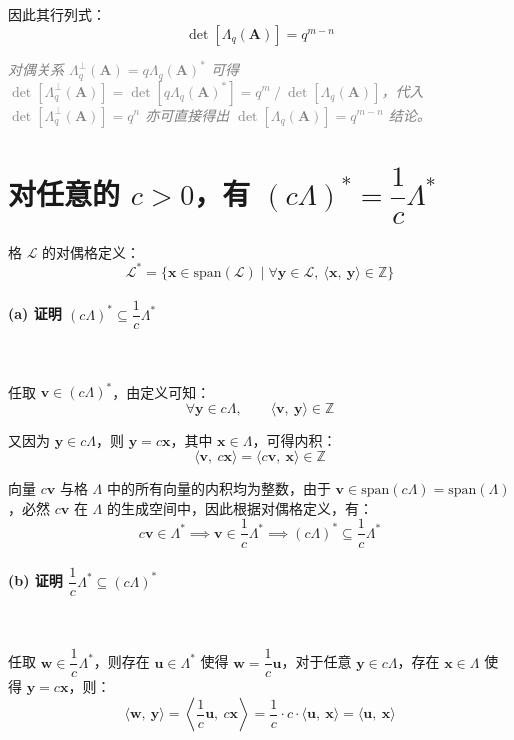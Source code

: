 \documentclass{article}
\begin{document}
因此其行列式：
\[ \det\left[\Lambda_{q}\left(\bm{A}\right)\right]=q^{m-n} \]

\textit{\textcolor{gray}{对偶关系 $\Lambda_{q}^{\perp}\left(\bm{A}\right)=q\Lambda_q(\bm{A})^{*}$ 可得 $\det\left[\Lambda_{q}^{\perp}\left(\bm{A}\right)\right]=\det\left[q\Lambda_q\left(\bm{A}\right)^{*}\right]=q^m\ /\ \det\left[\Lambda_q\left(\bm{A}\right)\right]$，代入 $\det\left[\Lambda_{q}^{\perp}\left(\bm{A}\right)\right]=q^n$ 亦可直接得出 $\det\left[\Lambda_{q}\left(\bm{A}\right)\right]=q^{m-n}$ 结论。}}



\section{对任意的 $c>0$，有 $(c\Lambda)^{*}=\dfrac{1}{c}\Lambda^{*}$}

格 $\mathcal{L}$ 的对偶格定义：
\[ \mathcal{L}^{*}=\{\bm{x}\in\mathrm{span}\left(\mathcal{L}\right)\mid\forall\bm{y}\in\mathcal{L},\ \langle\bm{x},\ \bm{y}\rangle\in\mathbb{Z} \} \]



\paragraph*{(a) 证明 $(c\Lambda)^{*}\subseteq\dfrac{1}{c}\Lambda^{*}$}~{\\[-7pt]}

任取 $\bm{v}\in(c\Lambda)^{*}$，由定义可知：
\[ \forall\bm{y}\in c\Lambda,\qquad\langle\bm{v},\ \bm{y}\rangle\in\mathbb{Z} \]

又因为 $\bm{y}\in c\Lambda$，则 $\bm{y}=c\bm{x}$，其中 $\bm{x}\in\Lambda$，可得内积：
\[ \langle\bm{v},\ c\bm{x}\rangle=\langle c\bm{v},\ \bm{x}\rangle\in\mathbb{Z} \]

向量 $c\bm{v}$ 与格 $\Lambda$ 中的所有向量的内积均为整数，由于 $\bm{v}\in\mathrm{span}\left(c\Lambda\right)=\mathrm{span}\left(\Lambda\right)$，必然 $c\bm{v}$ 在 $\Lambda$ 的生成空间中，因此根据对偶格定义，有：
\[ c\bm{v}\in\Lambda^{*}\implies\bm{v}\in\dfrac{1}{c}\Lambda^{*}\implies(c\Lambda)^{*}\subseteq\dfrac{1}{c}\Lambda^{*} \]



\paragraph*{(b) 证明 $\dfrac{1}{c}\Lambda^{*}\subseteq(c\Lambda)^{*}$}~{\\[-7pt]}

任取 $\bm{w}\in\dfrac{1}{c}\Lambda^{*}$，则存在 $\bm{u}\in\Lambda^{*}$ 使得 $\bm{w}=\dfrac{1}{c}\bm{u}$，对于任意 $\bm{y}\in c\Lambda$，存在 $\bm{x}\in\Lambda$ 使得 $\bm{y}=c\bm{x}$，则：
\[ \langle\bm{w},\ \bm{y}\rangle=\left\langle\dfrac{1}{c}\bm{u},\ c\bm{x}\right\rangle=\dfrac{1}{c}\cdot c\cdot\langle\bm{u},\ \bm{x}\rangle=\langle\bm{u},\ \bm{x}\rangle \]
\end{document}
